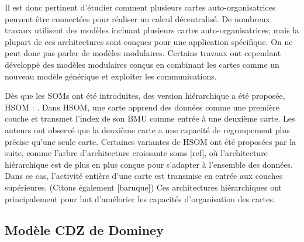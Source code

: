 Il est donc pertinent d'étudier comment plusieurs cartes auto-organisatrices peuvent être connectées pour réaliser un calcul décentralisé.
De nombreux travaux utilisent des modèles incluant plusieurs cartes auto-organisatrices; mais la plupart de ces architectures sont conçues pour une application spécifique.
On ne peut donc pas parler de modèles modulaires. Certains travaux ont cependant développé des modèles modulaires conçus en combinant les cartes comme un nouveau modèle générique et exploiter les communications.

Dès que les SOMs ont été introduites, des version hiérarchique a été proposée, HSOM : \cite{lampinen_clustering_1992,koikkalainen_self-organizing_1990} . Dans HSOM, une carte apprend des données comme une première couche et transmet l'index de son BMU comme entrée à une deuxième carte. Les auteurs ont observé que la deuxième carte a une capacité de regroupement plus précise qu'une seule carte. Certaines variantes de HSOM ont été proposées par la suite, comme l'arbre d'architecture croissante soms [ref], où l'architecture hiérarchique est de plus en plus conçue pour s'adapter à l'ensemble des données. Dans ce cas, l'activité entière d'une carte est transmise en entrée aux couches supérieures. (Citons également [baruque])
Ces architectures hiérarchiques ont principalement pour but d'amélorier les capacités d'organisation des cartes.





\subsection{Modèle CDZ de Dominey}

